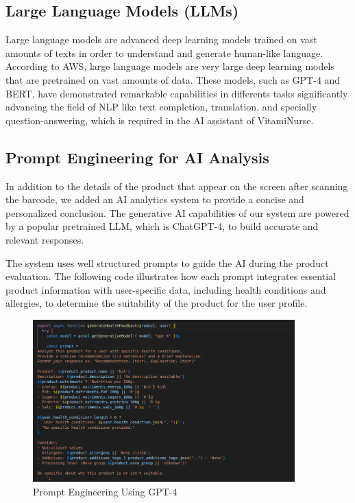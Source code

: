 \subsection{Large Language Models (LLMs)}
Large language models are advanced deep learning models trained on vast amounts of texts in order to understand and generate human-like language. 
According to AWS, large language models are very large deep learning models that are pretrained on vast amounts of data\cite{awsLLM}. These models, such as GPT-4 and BERT, have demonstrated remarkable capabilities in differents tasks  significantly advancing the field of NLP like text completion, translation, and specially question-answering, which is required in the  AI assistant of VitamiNurse.

\subsection{Prompt Engineering for AI Analysis}
\par In addition to the details of the product that appear on the screen after scanning the barcode, we added an AI analytics system to provide a concise and personalized conclusion.
 The generative AI capabilities of our system are powered by a popular pretrained LLM, which is ChatGPT-4, to build accurate and relevant responses.
 \par The system uses well structured prompts to guide the AI during the product evaluation.
The following code illustrates how each prompt integrates essential product information with user-specific data, including health conditions and allergies, to determine the suitability of the product for the user profile.
 \begin{center}
    \begin{figure}[H]
    \includegraphics[width=0.9\textwidth]{images/prompt_engineering.png}
    \caption{Prompt Engineering Using GPT-4} 
    \label{fig:Prompt_Engineering}
\end{figure}
\end{center}

